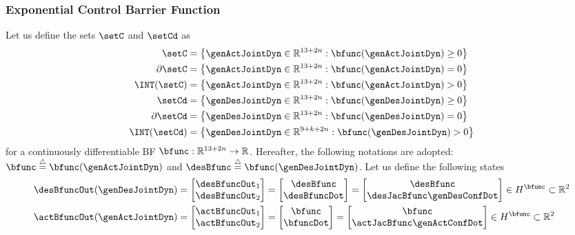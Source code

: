 \subsubsection{Exponential Control Barrier Function}\label{subsec-chap3:ECBF} 
Let us define the sets $\setC$ and $\setCd$ as  
\begin{align}
	\label{eq:act C}\setC &=\left\{\genActJointDyn\in \mathbb{R}^{13+2n}:\bfunc(\genActJointDyn)\geq0\right\}\\
	\label{eq:border act C}\partial\setC &=\left\{\genActJointDyn\in \mathbb{R}^{13+2n}:\bfunc(\genActJointDyn)=0\right\}\\
	\label{eq:int act C}\INT(\setC) &=\left\{\genActJointDyn\in \mathbb{R}^{13+2n}:\bfunc(\genActJointDyn)>0\right\}\\
	\label{eq:des C}\setCd &=\left\{\genDesJointDyn\in \mathbb{R}^{13+2n}:\bfunc(\genDesJointDyn)\geq0\right\}\\
	\label{eq:border des C}\partial\setCd &=\left\{\genDesJointDyn\in \mathbb{R}^{13+2n}:\bfunc(\genDesJointDyn)=0\right\}\\\label{eq:int des C}\INT(\setCd) &=\left\{\genDesJointDyn\in \mathbb{R}^{9+k+2n}:\bfunc(\genDesJointDyn)>0\right\}
\end{align}
for a continuously differentiable BF $\bfunc:\mathbb{R}^{13+2n}\rightarrow\mathbb{R}$. %
Hereafter, the following notations are adopted: $\bfunc\overset{\triangle}{=}\bfunc(\genActJointDyn)$ and $\desBfunc\overset{\triangle}{=}\bfunc(\genDesJointDyn)$.	
Let us define the following states 
\begin{align}
	\label{eq:des Bfunc state}
	\desBfuncOut(\genDesJointDyn) &= 	\begin{bmatrix}
		\desBfuncOut_1 \\
		\desBfuncOut_2
	\end{bmatrix}=
	\begin{bmatrix}
		\desBfunc \\
		\desBfuncDot
	\end{bmatrix}=
	\begin{bmatrix}
		\desBfunc \\
		\desJacBfunc\genDesConfDot
	\end{bmatrix}\in {{H^{\bfunc}}}\subset\mathbb{R}^{2} \\
	\label{eq:act Bfunc state}
	\actBfuncOut(\genActJointDyn) &= \begin{bmatrix}
		\actBfuncOut_1 \\
		\actBfuncOut_2
	\end{bmatrix}=
	\begin{bmatrix}
		\bfunc \\
		\bfuncDot
	\end{bmatrix}=
	\begin{bmatrix}
		\bfunc \\
		\actJacBfunc\genActConfDot
	\end{bmatrix} \in {{H^{\bfunc}}}\subset\mathbb{R}^{2}
\end{align}
